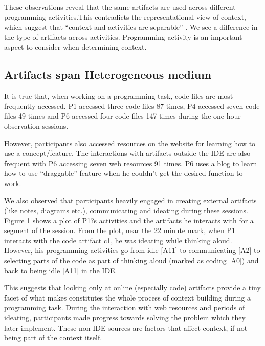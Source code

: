 These observations reveal that the same artifacts are used across different programming activities.This contradicts the representational view of context, which suggest that ``context and activities are separable'' \cite{Dourish:2004,Gasparic:2017}. We see a difference in the type of artifacts across activities. Programming activity is an important aspect to consider when determining context. 

\subsection{Artifacts span Heterogeneous medium}

It is true that, when working on a programming task, code files are most frequently accessed. P1 accessed three code files 87 times, P4 accessed seven code files 49 times and P6 accessed four code files 147 times during the one hour observation sessions.

However, participants also accessed resources on the website for learning how to use a concept/feature. The interactions with artifacts outside the IDE are also frequent with P6 accessing seven web resources 91 times. P6 uses a blog to learn how to use ``draggable'' feature when he couldn't get the desired function to work.

We also observed that participants heavily engaged in creating external artifacts (like notes, diagrams etc.), communicating and ideating during these sessions. Figure 1 shows a plot of P1?s activities and the artifacts he interacts with for a segment of the session. From the plot, near the 22 minute mark, when P1 interacts with the code artifact c1, he was ideating while thinking aloud. However, his programming activities go from idle [A11] to communicating [A2] to selecting parts of the code as part of thinking aloud (marked as coding [A0]) and back to being idle [A11] in the IDE. 

This suggests that looking only at online (especially code) artifacts provide a tiny facet of what makes constitutes the whole process of context building during a programming task. During the interaction with web resources and periods of ideating, participants made progress towards solving the problem which they later implement. These non-IDE sources are factors that affect context, if not being part of the context itself.

